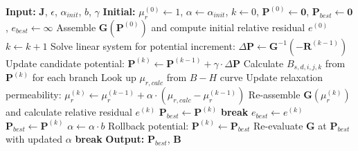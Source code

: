 \begin{algorithm}[H]
\caption{Advanced 3D-MBGRN Nonlinear Solver with Backtracking}
\label{alg:nonlinear}
\begin{algorithmic}[1]
\STATE \textbf{Input:} $\mathbf{J}$, $\epsilon$, $\alpha_{init}$, $b$, $\gamma$
\STATE \textbf{Initial:} $\mu_r^{(0)} \leftarrow 1$, $\alpha \leftarrow \alpha_{init}$, $k \leftarrow 0$, $\mathbf{P}^{(0)} \leftarrow \mathbf{0}$, $\mathbf{P}_{best} \leftarrow \mathbf{0}$, $e_{best} \leftarrow \infty$
\STATE Assemble $\mathbf{G}(\mathbf{P}^{(0)})$ and compute initial relative residual $e^{(0)}$
    \STATE $k \leftarrow k + 1$
    \STATE Solve linear system for potential increment: $\Delta \mathbf{P} \leftarrow \mathbf{G}^{-1} (-\mathbf{R}^{(k-1)})$
    \STATE Update candidate potential: $\mathbf{P}^{(k)} \leftarrow \mathbf{P}^{(k-1)} + \gamma \cdot \Delta \mathbf{P}$
    \STATE Calculate $B_{s,d,i,j,k}$ from $\mathbf{P}^{(k)}$ for each branch
    \STATE Look up $\mu_{r,calc}$ from $B-H$ curve
    \STATE Update relaxation permeability: $\mu_r^{(k)} \leftarrow \mu_r^{(k-1)} + \alpha \cdot (\mu_{r,calc} - \mu_r^{(k-1)})$
    \STATE Re-assemble $\mathbf{G}(\mu_r^{(k)})$ and calculate relative residual $e^{(k)}$
        \STATE $\mathbf{P}_{best} \leftarrow \mathbf{P}^{(k)}$
        \STATE \textbf{break}
    \ENDIF
        \STATE $e_{best} \leftarrow e^{(k)}$
        \STATE $\mathbf{P}_{best} \leftarrow \mathbf{P}^{(k)}$
    \ELSE
        \STATE $\alpha \leftarrow \alpha \cdot b$ 
        \STATE Rollback potential: $\mathbf{P}^{(k)} \leftarrow \mathbf{P}_{best}$
        \STATE Re-evaluate $\mathbf{G}$ at $\mathbf{P}_{best}$ with updated $\alpha$
    \ENDIF
        \STATE \textbf{break} 
    \ENDIF
\ENDWHILE
\STATE \textbf{Output:} $\mathbf{P}_{best}$, $\mathbf{B}$
\end{algorithmic}
\end{algorithm}